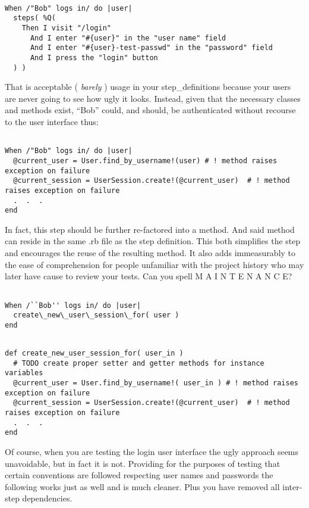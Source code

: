 \documentclass[10pt]{book}
\begin{document}
\begin{verbatim}

When /"Bob" logs in/ do |user|
  steps( %Q(
    Then I visit "/login"
      And I enter "#{user}" in the "user name" field
      And I enter "#{user}-test-passwd" in the "password" field
      And I press the "login" button
  ) )

\end{verbatim}
That is acceptable ( \emph{barely} ) usage in your step\_definitions because your users are never going to see how ugly it looks. Instead, given that the necessary classes and methods exist, ``Bob'' could, and should, be authenticated without recourse to the user interface thus:

\begin{verbatim}

When /"Bob" logs in/ do |user|
  @current_user = User.find_by_username!(user) # ! method raises exception on failure
  @current_session = UserSession.create!(@current_user)  # ! method raises exception on failure
  .  .  .
end

\end{verbatim}
In fact, this step should be further re-factored into a method.  And said method can reside in the same .rb file as the step definition.  This both simplifies the step and encourages the reuse of the resulting method.  It also adds immeasurably to the ease of comprehension for people unfamiliar with the project history who may later have cause to review your tests.  Can you spell M A I N T E N A N C E?
\begin{verbatim}

When /``Bob'' logs in/ do |user|
  create\_new\_user\_session\_for( user )
end

\end{verbatim}

\begin{verbatim}

def create_new_user_session_for( user_in )
  # TODO create proper setter and getter methods for instance variables
  @current_user = User.find_by_username!( user_in ) # ! method raises exception on failure
  @current_session = UserSession.create!(@current_user)  # ! method raises exception on failure
  .  .  .
end

\end{verbatim}
Of course, when you are testing the login user interface the ugly approach seems unavoidable, but in fact it is not. Providing for the purposes of testing that certain conventions are followed respecting user names and passwords the following works just as well and is much cleaner.  Plus you have removed all inter-step dependencies.
\end{document}

